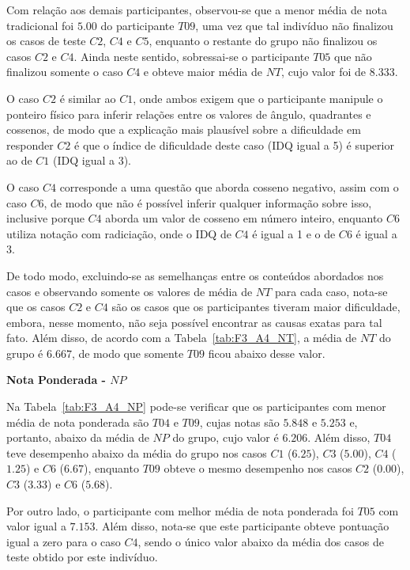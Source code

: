 Com relação aos demais participantes, observou-se que a menor média de nota tradicional foi $5.00$ do participante $T09$, uma vez que tal indivíduo não finalizou os casos de teste $C2$, $C4$ e $C5$, enquanto o restante do grupo não finalizou os casos $C2$ e $C4$. Ainda neste sentido, sobressai-se o participante $T05$ que não finalizou somente o caso $C4$ e obteve maior média de $NT$, cujo valor foi de $8.333$.

O caso $C2$ é similar ao $C1$, onde ambos exigem que o participante manipule o ponteiro físico para inferir relações entre os valores de ângulo, quadrantes e cossenos, de modo que a explicação mais plausível sobre a dificuldade em responder $C2$ é que o índice de dificuldade deste caso (IDQ igual a 5) é superior ao de $C1$ (IDQ igual a 3). %

O caso $C4$ corresponde a uma questão que aborda cosseno negativo, assim com o caso $C6$, de modo que não é possível inferir qualquer informação sobre isso, inclusive porque $C4$ aborda um valor de cosseno em número inteiro, enquanto $C6$ utiliza notação com radiciação, onde o IDQ de $C4$ é igual a 1 e o de $C6$ é igual a 3.

De todo modo, excluindo-se as semelhanças entre os conteúdos abordados nos casos e observando somente os valores de média de $NT$ para cada caso, nota-se que os casos $C2$ e $C4$ são os casos que os participantes tiveram maior dificuldade, embora, nesse momento, não seja possível encontrar as causas exatas para tal fato. Além disso, de acordo com a Tabela~\ref{tab:F3_A4_NT}, a média de $NT$ do grupo é $6.667$, de modo que somente $T09$ ficou abaixo desse valor.

\textbf{Nota Ponderada - $NP$}

Na Tabela~\ref{tab:F3_A4_NP} pode-se verificar que os participantes com menor média de nota ponderada são $T04$ e $T09$, cujas notas são $5.848$ e $5.253$ e, portanto, abaixo da média de $NP$ do grupo, cujo valor é $6.206$. Além disso, $T04$ teve desempenho abaixo da média do grupo nos casos $C1$ ($6.25$), $C3$ ($5.00$), $C4$ ($1.25$) e $C6$ ($6.67$), enquanto $T09$ obteve o mesmo desempenho nos casos $C2$ ($0.00$), $C3$ ($3.33$) e $C6$ ($5.68$). 

Por outro lado, o participante com melhor média de nota ponderada foi $T05$ com valor igual a $7.153$. Além disso, nota-se que este participante obteve pontuação igual a zero para o caso $C4$, sendo o único valor abaixo da média dos casos de teste obtido por este indivíduo.

